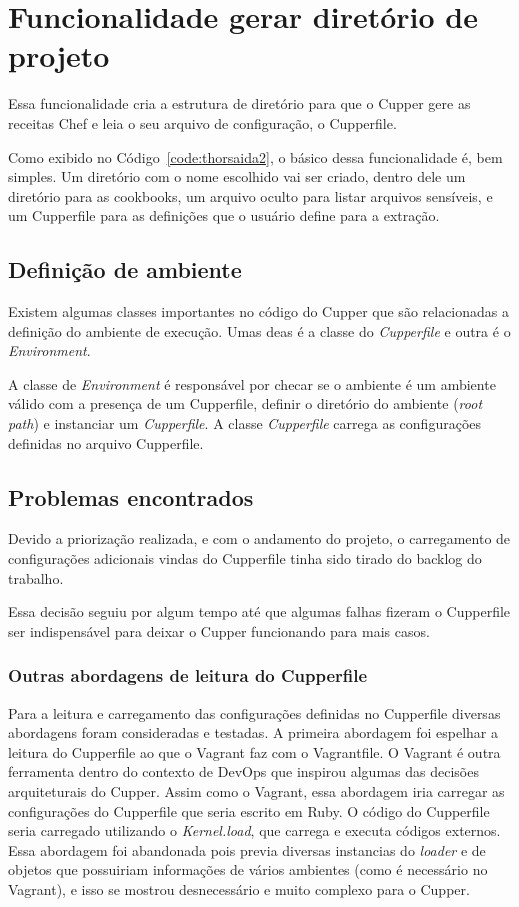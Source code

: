 \section{Funcionalidade gerar diretório de projeto}
\label{sec:proj}

Essa funcionalidade cria a estrutura de diretório para que o Cupper gere as 
receitas Chef e leia o seu arquivo de configuração, o Cupperfile.

Como exibido no Código~\ref{code:thorsaida2}, o básico dessa funcionalidade é, bem
simples. Um diretório com o nome escolhido vai ser criado, dentro dele um diretório
para as cookbooks, um arquivo oculto para listar arquivos sensíveis, e um 
Cupperfile para as definições que o usuário define para a extração.

\subsection{Definição de ambiente}
Existem algumas classes importantes no código do Cupper que são relacionadas a
definição do ambiente de execução. Umas deas é a classe do \textit{Cupperfile} e outra
é o \textit{Environment}.

A classe de \textit{Environment} é responsável por checar se o ambiente é um
ambiente válido com a presença de um Cupperfile, definir o diretório do ambiente
(\textit{root\underline{ }path}) e instanciar um \textit{Cupperfile}. A classe \textit{Cupperfile} carrega as configurações definidas no arquivo Cupperfile.

\subsection{Problemas encontrados}
Devido a priorização realizada, e com o andamento do projeto, o carregamento de
configurações adicionais vindas do Cupperfile tinha sido tirado do backlog do
trabalho.

Essa decisão seguiu por algum tempo até que algumas falhas fizeram o Cupperfile
ser indispensável para deixar o Cupper funcionando para mais casos.

\subsubsection{Outras abordagens de leitura do Cupperfile}
Para a leitura e carregamento das configurações definidas no Cupperfile diversas
abordagens foram consideradas e testadas. A primeira abordagem foi espelhar a
leitura do Cupperfile ao que o Vagrant faz com o Vagrantfile. O Vagrant é outra
ferramenta dentro do contexto de DevOps que inspirou algumas das decisões arquiteturais
do Cupper. Assim como o Vagrant, essa abordagem iria carregar as configurações
do Cupperfile que seria escrito em Ruby. O código do Cupperfile seria carregado
utilizando o \textit{Kernel.load}, que carrega e executa códigos externos.
Essa abordagem foi abandonada pois previa diversas instancias do \textit{loader}
e de objetos que possuiriam informações de vários ambientes (como é necessário
no Vagrant), e isso se mostrou desnecessário e muito complexo para o Cupper.

